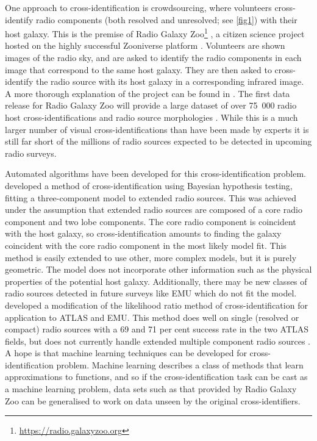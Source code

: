 \documentclass[fleqn,usenatbib,usedcolumn]{mnras}
\begin{document}
  One approach to cross-identification is crowdsourcing, where volunteers
  cross-identify radio components (both resolved and unresolved; see
  \autoref{fig1}) with their host galaxy. This is the premise of Radio Galaxy
  Zoo\footnote{\url{https://radio.galaxyzoo.org}} \citep{banfield15}, a
  citizen science project hosted on the highly successful Zooniverse platform
  \citep{lintott08}. Volunteers are shown images of the radio sky, and are
  asked to identify the radio components in each image that correspond to the
  same host galaxy. They are then asked to cross-identify the radio source
  with its host galaxy in a corresponding infrared image. A more thorough
  explanation of the project can be found in \citet{banfield15}. The first
  data release for Radio Galaxy Zoo will provide a large dataset of over
  75~000 radio host cross-identifications and radio source morphologies
  \citep{wong17}. While this is a much larger number of visual
  cross-identifications than have been made by experts \citep[e.g.,
  ][]{Taylor2007,Gendre2008,Grant2010,norris06,middelberg08} it is still far
  short of the millions of radio sources expected to be detected in upcoming
  radio surveys.

  Automated algorithms have been developed for this cross-identification
  problem. \citet{fan15} developed a method of cross-identification using
  Bayesian hypothesis testing, fitting a three-component model to extended
  radio sources. This was achieved under the assumption that extended radio
  sources are composed of a core radio component and two lobe components. The
  core radio component is coincident with the host galaxy, so
  cross-identification amounts to finding the galaxy coincident with the core
  radio component in the most likely model fit. This method is easily extended
  to use other, more complex models, but it is purely geometric. The model
  does not incorporate other information such as the physical properties of
  the potential host galaxy. Additionally, there may be new classes of radio
  sources detected in future surveys like EMU which do not fit the model.
  \citet{weston17} developed a modification of the likelihood ratio method of
  cross-identification \citep{richter75likelihood} for application to ATLAS
  and EMU. This method does well on single (resolved or compact) radio sources
  with a 69 and 71 per cent success rate in the two ATLAS fields, but does not
  currently handle extended multiple component radio sources
  \citep{norris17unexpected}. A hope is that machine learning techniques can
  be developed for cross-identification problem. Machine learning describes a
  class of methods that learn approximations to functions, and so if the
  cross-identification task can be cast as a machine learning problem, data
  sets such as that provided by Radio Galaxy Zoo can be generalised to work on
  data unseen by the original cross-identifiers.
\end{document}
